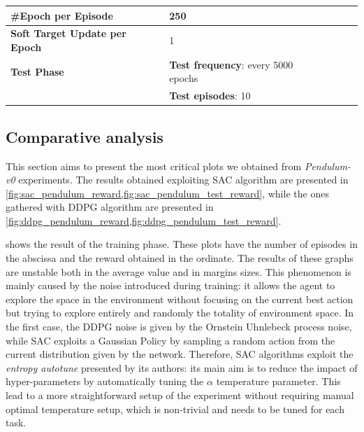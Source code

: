 \begin{table}[!h]
{\begin{tabular}{@{}lllll@{}}
			\textbf{\#Epoch per Episode}          & 250                                                    \\\midrule
			\textbf{Soft Target Update per Epoch} & 1                                                      \\\midrule
			\textbf{Test Phase}                   & \textbf{Test frequency}: every 5000 epochs             \\
			                                      & \textbf{Test episodes}: 10                             \\
			\bottomrule
		\end{tabular}}
\end{table}

\FloatBarrier

\subsection{Comparative analysis}

This section aims to present the most critical plots we obtained from \textit{Pendulum-v0} experiments.
The results obtained exploiting SAC algorithm are presented in \vref{fig:sac_pendulum_reward,fig:sac_pendulum_test_reward}, while the ones gathered with DDPG algorithm are presented in \vref{fig:ddpg_pendulum_reward,fig:ddpg_pendulum_test_reward}.

 shows the result of the training phase.
These plots have the number of episodes in the abscissa and the reward obtained in the ordinate.
The results of these graphs are unstable both in the average value and in margins sizes.
This phenomenon is mainly caused by the noise introduced during training: it allows the agent to explore the space in the environment without focusing on the current best action but trying to explore entirely and randomly the totality of environment space.
In the first case, the DDPG noise is given by the Ornstein Uhnlebeck process noise, while SAC exploits a Gaussian Policy by sampling a random action from the current distribution given by the network.
Therefore, SAC algorithms exploit the \textit{entropy autotune} presented by its authors: its main aim is to reduce the impact of hyper-parameters by automatically tuning the $\alpha$ temperature parameter.
This lead to a more straightforward setup of the experiment without requiring manual optimal temperature setup, which is non-trivial and needs to be tuned for each task.

